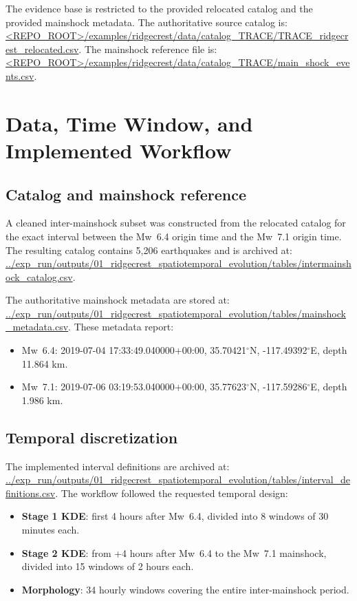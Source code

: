 \documentclass[11pt]{article}
\begin{document}
The evidence base is restricted to the provided relocated catalog and the provided mainshock metadata. The authoritative source catalog is:
\url{<REPO_ROOT>/examples/ridgecrest/data/catalog_TRACE/TRACE_ridgecrest_relocated.csv}.
The mainshock reference file is:
\url{<REPO_ROOT>/examples/ridgecrest/data/catalog_TRACE/main_shock_events.csv}.

\section{Data, Time Window, and Implemented Workflow}
\subsection{Catalog and mainshock reference}
A cleaned inter-mainshock subset was constructed from the relocated catalog for the exact interval between the Mw~6.4 origin time and the Mw~7.1 origin time. The resulting catalog contains 5,206 earthquakes and is archived at:
\url{../exp_run/outputs/01_ridgecrest_spatiotemporal_evolution/tables/intermainshock_catalog.csv}.

The authoritative mainshock metadata are stored at:
\url{../exp_run/outputs/01_ridgecrest_spatiotemporal_evolution/tables/mainshock_metadata.csv}.
These metadata report:
\begin{itemize}[leftmargin=2em]
    \item Mw~6.4: 2019-07-04 17:33:49.040000+00:00, 35.70421$^{\circ}$N, -117.49392$^{\circ}$E, depth 11.864 km.
    \item Mw~7.1: 2019-07-06 03:19:53.040000+00:00, 35.77623$^{\circ}$N, -117.59286$^{\circ}$E, depth 1.986 km.
\end{itemize}

\subsection{Temporal discretization}
The implemented interval definitions are archived at:
\url{../exp_run/outputs/01_ridgecrest_spatiotemporal_evolution/tables/interval_definitions.csv}.
The workflow followed the requested temporal design:
\begin{itemize}[leftmargin=2em]
    \item \textbf{Stage 1 KDE}: first 4 hours after Mw~6.4, divided into 8 windows of 30 minutes each.
    \item \textbf{Stage 2 KDE}: from +4 hours after Mw~6.4 to the Mw~7.1 mainshock, divided into 15 windows of 2 hours each.
    \item \textbf{Morphology}: 34 hourly windows covering the entire inter-mainshock period.
\end{itemize}
\end{document}
